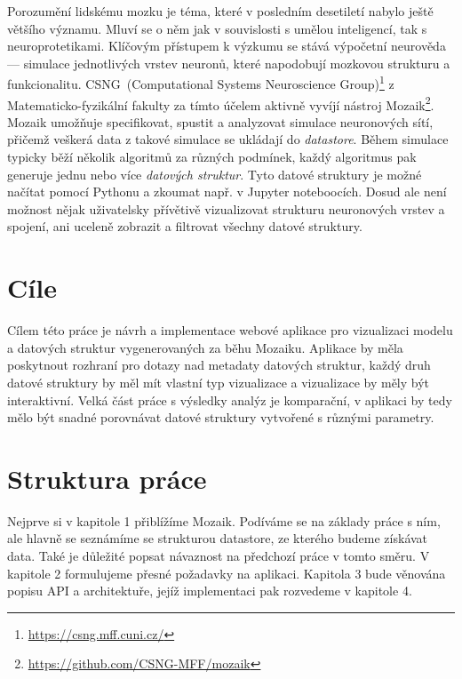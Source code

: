 

Porozumění lidskému mozku je téma, které v posledním desetiletí nabylo ještě většího významu. Mluví se o něm jak v souvislosti s umělou inteligencí, tak s neuroprotetikami. Klíčovým přístupem k výzkumu se stává výpočetní neurověda --- simulace jednotlivých vrstev neuronů, které napodobují mozkovou strukturu a funkcionalitu. CSNG~(Computational Systems Neuroscience Group)\footnote{\url{https://csng.mff.cuni.cz/}} z Matematicko-fyzikální fakulty za tímto účelem aktivně vyvíjí nástroj Mozaik\footnote{\url{https://github.com/CSNG-MFF/mozaik}}. Mozaik umožňuje specifikovat, spustit a analyzovat simulace neuronových sítí, přičemž veškerá data z takové simulace se ukládají do \emph{datastore}. Během simulace typicky běží několik algoritmů za různých podmínek, každý algoritmus pak generuje jednu nebo více \emph{datových struktur}. Tyto datové struktury je možné načítat pomocí Pythonu a zkoumat např. v Jupyter noteboocích. Dosud ale není možnost nějak uživatelsky přívětivě vizualizovat strukturu neuronových vrstev a spojení, ani uceleně zobrazit a filtrovat všechny datové struktury.

\section*{Cíle}

Cílem této práce je návrh a implementace webové aplikace pro vizualizaci modelu a datových struktur vygenerovaných za běhu Mozaiku. Aplikace by měla poskytnout rozhraní pro dotazy nad metadaty datových struktur, každý druh datové struktury by měl mít vlastní typ vizualizace a vizualizace by měly být interaktivní. Velká část práce s výsledky analýz je komparační, v aplikaci by tedy mělo být snadné porovnávat datové struktury vytvořené s různými parametry.

\section*{Struktura práce}

Nejprve si v kapitole 1 přiblížíme Mozaik. Podíváme se na základy práce s ním, ale hlavně se seznámíme se strukturou datastore, ze kterého budeme získávat data. Také je důležité popsat návaznost na předchozí práce v tomto směru. V kapitole 2 formulujeme přesné požadavky na aplikaci. Kapitola 3 bude věnována popisu API a architektuře, jejíž implementaci pak rozvedeme v kapitole 4.




